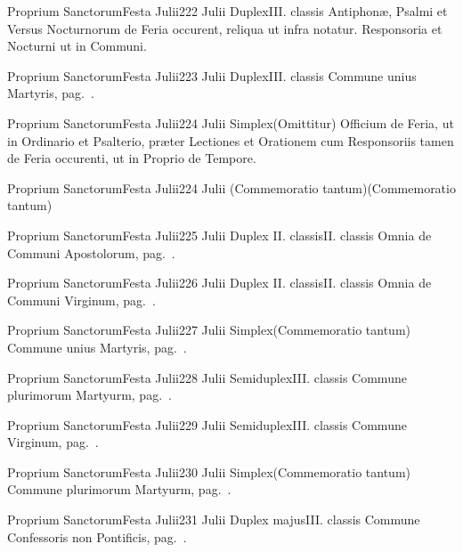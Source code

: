 \documentclass[nocturnale-romanum.tex]{subfiles}
\begin{document}
	{Proprium Sanctorum}{Festa Julii}{2}{22 Julii}
	{Duplex}{III. classis}
	{Antiphonæ, Psalmi et Versus Nocturnorum de Feria occurent, reliqua ut infra notatur. %
	Responsoria  et  Nocturni ut in Communi.}
	{}

	{Proprium Sanctorum}{Festa Julii}{2}{23 Julii}
	{Duplex}{III. classis}
	{Commune unius Martyris, pag.\ \pageref{M-UMEX}.}
	{}

	{Proprium Sanctorum}{Festa Julii}{2}{24 Julii}
	{Simplex}{(Omittitur)}
	{Officium de Feria, ut in Ordinario et Psalterio, præter Lectiones et Orationem cum Responsoriis tamen de Feria occurenti, ut in Proprio de Tempore.}
	{}

	{Proprium Sanctorum}{Festa Julii}{2}{24 Julii}
	{(Commemoratio tantum)}{(Commemoratio tantum)}
	{}
	{}

	{Proprium Sanctorum}{Festa Julii}{2}{25 Julii}
	{Duplex II. classis}{II. classis}
	{Omnia de Communi Apostolorum, pag.\ \pageref{M-APEX}.}
	{}

	{Proprium Sanctorum}{Festa Julii}{2}{26 Julii}
	{Duplex II. classis}{II. classis}
	{Omnia de Communi Virginum, pag.\ \pageref{M-MU}.}
	{}

	{Proprium Sanctorum}{Festa Julii}{2}{27 Julii}
	{Simplex}{(Commemoratio tantum)}
	{Commune unius Martyris, pag.\ \pageref{M-UMEX}.}
	{}

	{Proprium Sanctorum}{Festa Julii}{2}{28 Julii}
	{Semiduplex}{III. classis}
	{Commune plurimorum Martyurm, pag.\ \pageref{M-PMEX}.}
	{}

	{Proprium Sanctorum}{Festa Julii}{2}{29 Julii}
	{Semiduplex}{III. classis}
	{Commune Virginum, pag.\ \pageref{M-MU}.}
	{}

	{Proprium Sanctorum}{Festa Julii}{2}{30 Julii}
	{Simplex}{(Commemoratio tantum)}
	{Commune plurimorum Martyurm, pag.\ \pageref{M-PMEX}.}
	{}

	{Proprium Sanctorum}{Festa Julii}{2}{31 Julii}
	{Duplex majus}{III. classis}
	{Commune Confessoris non Pontificis, pag.\ \pageref{M-CONP}.}
	{}
\end{document}
